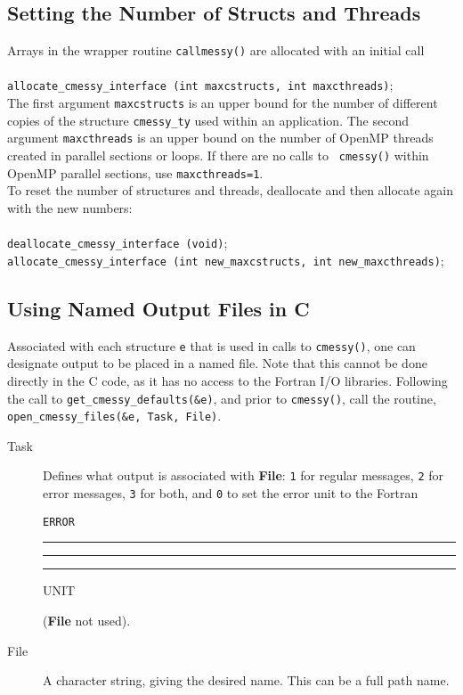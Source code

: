 \documentclass[12pt]{article}
\DeclareRobustCommand{\us}{\rule{.2pt}{0pt}\rule[-.8pt]{.4em}{.5pt}%
\rule{.2pt}{0pt}}
\DeclareRobustCommand{\us}{\rule{.2pt}{0pt}\rule[-.8pt]{.4em}{.5pt}%
\rule{.2pt}{0pt}}
\begin{document}
\subsection{Setting the Number of Structs and Threads}
Arrays in the wrapper routine {\tt callmessy()} are allocated with an initial
call\\
\\{\tt allocate\_cmessy\_interface (int maxcstructs, int maxcthreads)};\\

The first argument {\tt maxcstructs} is an upper bound for the number of
different copies of the structure {\tt cmessy\_ty} used within an application.
The second argument {\tt maxcthreads} is an upper bound on the number of OpenMP
threads created in parallel sections or loops.  If there are no calls to {\tt
  cmessy()} within OpenMP parallel sections, use {\tt  maxcthreads=1}.\\

To reset the number of structures and threads, deallocate and then allocate
again with the new numbers:\\
\\{\tt deallocate\_cmessy\_interface (void)};\\
{\tt allocate\_cmessy\_interface (int new\_maxcstructs, int
  new\_maxcthreads)};\\

\subsection{Using Named Output Files in C}
Associated with each structure {\tt e} that is used in calls to {\tt cmessy()},
one can designate output to be placed in a named file.  Note that this cannot be
done directly in the C code, as it has no access to the Fortran I/O libraries.
Following the call to
{\tt get\_cmessy\_defaults(\&e)}, and prior to {\tt cmessy()}, call the
routine,\\

{\tt open\_cmessy\_files(\&e, Task, File)}.

\begin{description}
\item[Task] Defines what output is associated with {\bf File}: {\tt 1} for
  regular messages, {\tt 2} for error messages, {\tt 3} for both, and {\tt 0} to
  set the error unit to the Fortran {\tt ERROR\us UNIT} ({\bf File} not used).
\item[File] A character string, giving the desired name.  This can be a full
  path name.
\end{description}
\end{document}
